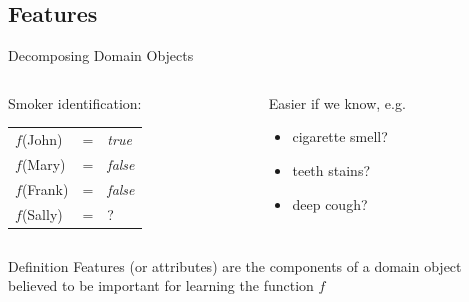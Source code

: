 \documentclass[14pt]{beamer}
\begin{document}
\subsection{Features}

\begin{frame}{Decomposing Domain Objects}
\begin{columns}[T]
\begin{column}{0.4\textwidth}
Smoker identification: \\
\smallskip
\begin{tabular}{lll}
$f$(John)  & = & \textit{true} \\
$f$(Mary)  & = & \textit{false} \\
$f$(Frank) & = & \textit{false} \\
$f$(Sally) & = & ?
\end{tabular}
\end{column}
\pause
\begin{column}{0.55\textwidth}
Easier if we know, e.g.
\begin{itemize}
\item cigarette smell?
\item teeth stains?
\item deep cough?
\end{itemize}
\end{column}
\end{columns}
\bigskip
\pause
\begin{block}{Definition}
\alert{Features} (or \alert{attributes}) are the components of a domain object believed to be important for learning the function $f$
\end{block}
\end{frame}
\end{document}
